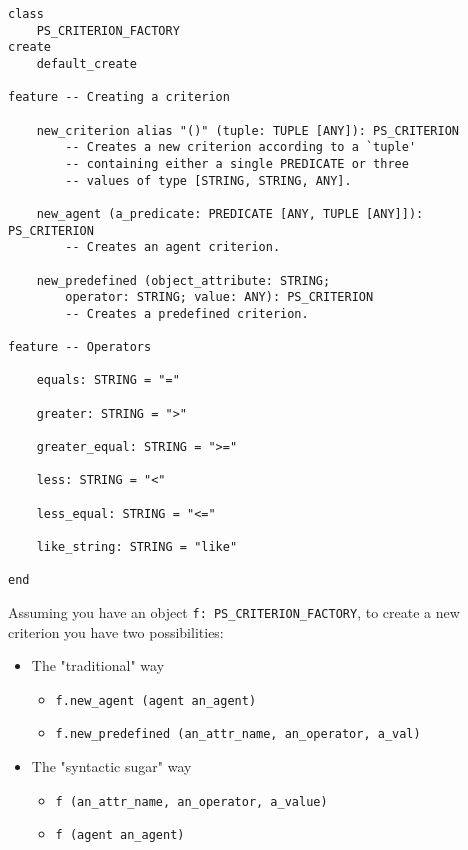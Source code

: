 \documentclass[a4paper,12pt]{report}
\begin{document}
\begin{lstlisting}[language=OOSC2Eiffel, captionpos=b, caption={The CRITERION\_FACTORY class interface}, label={lst:factory_interface}]
class
	PS_CRITERION_FACTORY
create
	default_create

feature -- Creating a criterion

	new_criterion alias "()" (tuple: TUPLE [ANY]): PS_CRITERION
		-- Creates a new criterion according to a `tuple'
		-- containing either a single PREDICATE or three 
		-- values of type [STRING, STRING, ANY].

	new_agent (a_predicate: PREDICATE [ANY, TUPLE [ANY]]): PS_CRITERION
		-- Creates an agent criterion.

	new_predefined (object_attribute: STRING; 
		operator: STRING; value: ANY): PS_CRITERION
		-- Creates a predefined criterion.

feature -- Operators

	equals: STRING = "="

	greater: STRING = ">"

	greater_equal: STRING = ">="

	less: STRING = "<"

	less_equal: STRING = "<="

	like_string: STRING = "like"

end
\end{lstlisting}

Assuming you have an object \lstinline{f: PS_CRITERION_FACTORY}, to create a new criterion you have two possibilities:

 \begin{itemize}
  \item The "traditional" way
  \begin{itemize}
  \item \lstinline!f.new_agent (agent an_agent)!
  \item \lstinline!f.new_predefined (an_attr_name, an_operator, a_val)!
  \end{itemize}
  \item The "syntactic sugar" way
  \begin{itemize}
  \item \lstinline!f (an_attr_name, an_operator, a_value)!
  \item \lstinline!f (agent an_agent)!
  \end{itemize} 
  \end{itemize}
  
\end{document}
